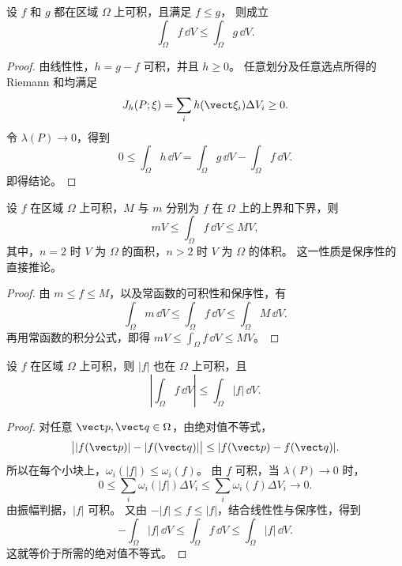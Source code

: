\begin{proposition}[保序性]\label{p2-integral-monotonicity}
设 $f$ 和 $g$ 都在区域 $\Omega$ 上可积，且满足 $f\le g$，
则成立
\[
\int_\Omega f\,\dd V\le\int_\Omega g\,\dd V.
\]
\end{proposition}
\begin{proof}
由线性性，$h=g-f$ 可积，并且 $h\ge0$。
任意划分及任意选点所得的 Riemann 和均满足
\[
J_h(P;\xi)=\sum_i h(\vect\xi_i)\Delta V_i\ge0.
\]
令 $\lambda(P)\to0$，得到
\[
0\le\int_\Omega h\,\dd V
=\int_\Omega g\,\dd V-\int_\Omega f\,\dd V.
\]
即得结论。
\end{proof}
\begin{corollary}
	[积分的上下界]\label{p2-integral-bounds}
	设 $f$ 在区域 $\Omega$ 上可积，$M$ 与 $m$ 分别为 $f$ 在 $\Omega$
	上的上界和下界，则
	\[
	mV\le\int_\Omega f\,\dd V\le MV,
	\]
	其中，$n=2$ 时 $V$ 为 $\Omega$ 的面积，$n>2$ 时 $V$ 为 $\Omega$ 的体积。
	这一性质是保序性的直接推论。
\end{corollary}


\begin{proof}
由 $m\le f\le M$，以及常函数的可积性和保序性，有
\[
\int_\Omega m\,\dd V
\le\int_\Omega f\,\dd V
\le\int_\Omega M\,\dd V.
\]
再用常函数的积分公式，即得
$\displaystyle mV\le\displaystyle\int_\Omega f\,\dd V\le MV$。
\end{proof}

\begin{proposition}[绝对可积性]\label{p2-integral-absolute-value}
设 $f$ 在区域 $\Omega$ 上可积，则 $|f|$ 也在 $\Omega$ 上可积，且
\[
\left|\int_\Omega f\,\dd V\right|
\le\int_\Omega|f|\,\dd V.
\]
\end{proposition}
\begin{proof}
对任意 $\vect p,\vect q\in\Omega$，由绝对值不等式，
\[
\bigl||f(\vect p)|-|f(\vect q)|\bigr|
\le|f(\vect p)-f(\vect q)|.
\]
所以在每个小块上，$\omega_i(|f|)\le\omega_i(f)$。
由 $f$ 可积，当 $\lambda(P)\to0$ 时，
\[
0\le\sum_i\omega_i(|f|)\Delta V_i
\le\sum_i\omega_i(f)\Delta V_i\longrightarrow0.
\]
由振幅判据，$|f|$ 可积。
又由 $-|f|\le f\le|f|$，结合线性性与保序性，得到
\[
-\int_\Omega|f|\,\dd V
\le\int_\Omega f\,\dd V
\le\int_\Omega|f|\,\dd V.
\]
这就等价于所需的绝对值不等式。
\end{proof}

